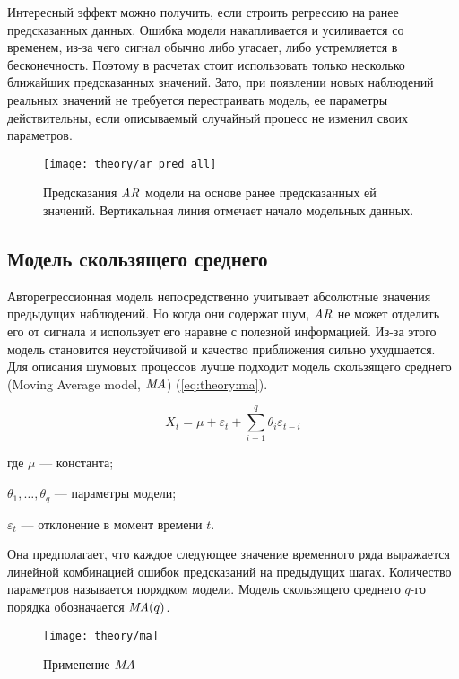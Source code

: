 Интересный эффект можно получить, если строить регрессию на ранее предсказанных данных. Ошибка модели накапливается и усиливается со временем, из-за чего сигнал обычно либо угасает, либо устремляется в бесконечность. Поэтому в расчетах стоит использовать только несколько ближайших предсказанных значений. Зато, при появлении новых наблюдений реальных значений не требуется перестраивать модель, ее параметры действительны, если описываемый случайный процесс не изменил своих параметров.

\begin{figure}[h]
  \centering
  \texttt{[image: theory/ar\_pred\_all]}
  \caption{Предсказания $\mathit{AR}$ модели на основе ранее предсказанных ей значений. Вертикальная линия отмечает начало модельных данных.}
  \label{fig:theory:ar_pred_all}
\end{figure}


\subsection{Модель скользящего среднего}

Авторегрессионная модель непосредственно учитывает абсолютные значения предыдущих наблюдений. Но когда они содержат шум, $\mathit{AR}$ не может отделить его от сигнала и использует его наравне с полезной информацией. Из-за этого модель становится неустойчивой и качество приближения сильно ухудшается. Для описания шумовых процессов лучше подходит модель скользящего среднего (Moving Average model, $\mathit{MA}$) (\autoref{eq:theory:ma}).

\begin{equation}
  \label{eq:theory:ma}
  X_t = \mu + \varepsilon_t + \sum_{i=1}^q \theta_i \varepsilon_{t-i}
\end{equation}
\begin{explanation}
\item[где] $\mu$ --- константа;
\item $\theta_1, \dotsc, \theta_q$ --- параметры модели;
\item $\varepsilon_t$ --- отклонение в момент времени $t$.
\end{explanation}

Она предполагает, что каждое следующее значение временного ряда выражается линейной комбинацией ошибок предсказаний на предыдущих шагах. Количество параметров называется порядком модели. Модель скользящего среднего $q$-го порядка обозначается $\mathit{MA}(q)$.

\begin{figure}[h]
  \centering
  \texttt{[image: theory/ma]}
  \caption{Применение $\mathit{MA}$}
  \label{fig:theory:ma}
\end{figure}

